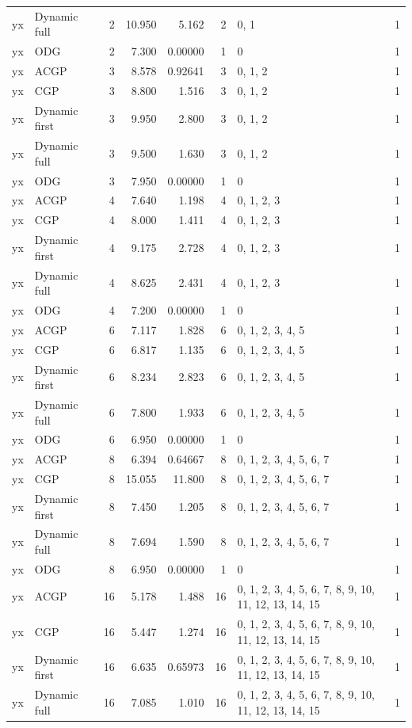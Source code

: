 \documentclass[10pt,a4paper]{article}
\begin{document}
\begin{longtable}{@{}p{23mm}p{29mm}rrrrp{36mm}r@{}}
yx & Dynamic full & 2 & 10.950 & 5.162 & 2 & 0, 1 & 1 \\
yx & ODG & 2 & 7.300 & 0.00000 & 1 & 0 & 1 \\
yx & ACGP & 3 & 8.578 & 0.92641 & 3 & 0, 1, 2 & 1 \\
yx & CGP & 3 & 8.800 & 1.516 & 3 & 0, 1, 2 & 1 \\
yx & Dynamic first & 3 & 9.950 & 2.800 & 3 & 0, 1, 2 & 1 \\
yx & Dynamic full & 3 & 9.500 & 1.630 & 3 & 0, 1, 2 & 1 \\
yx & ODG & 3 & 7.950 & 0.00000 & 1 & 0 & 1 \\
yx & ACGP & 4 & 7.640 & 1.198 & 4 & 0, 1, 2, 3 & 1 \\
yx & CGP & 4 & 8.000 & 1.411 & 4 & 0, 1, 2, 3 & 1 \\
yx & Dynamic first & 4 & 9.175 & 2.728 & 4 & 0, 1, 2, 3 & 1 \\
yx & Dynamic full & 4 & 8.625 & 2.431 & 4 & 0, 1, 2, 3 & 1 \\
yx & ODG & 4 & 7.200 & 0.00000 & 1 & 0 & 1 \\
yx & ACGP & 6 & 7.117 & 1.828 & 6 & 0, 1, 2, 3, 4, 5 & 1 \\
yx & CGP & 6 & 6.817 & 1.135 & 6 & 0, 1, 2, 3, 4, 5 & 1 \\
yx & Dynamic first & 6 & 8.234 & 2.823 & 6 & 0, 1, 2, 3, 4, 5 & 1 \\
yx & Dynamic full & 6 & 7.800 & 1.933 & 6 & 0, 1, 2, 3, 4, 5 & 1 \\
yx & ODG & 6 & 6.950 & 0.00000 & 1 & 0 & 1 \\
yx & ACGP & 8 & 6.394 & 0.64667 & 8 & 0, 1, 2, 3, 4, 5, 6, 7 & 1 \\
yx & CGP & 8 & 15.055 & 11.800 & 8 & 0, 1, 2, 3, 4, 5, 6, 7 & 1 \\
yx & Dynamic first & 8 & 7.450 & 1.205 & 8 & 0, 1, 2, 3, 4, 5, 6, 7 & 1 \\
yx & Dynamic full & 8 & 7.694 & 1.590 & 8 & 0, 1, 2, 3, 4, 5, 6, 7 & 1 \\
yx & ODG & 8 & 6.950 & 0.00000 & 1 & 0 & 1 \\
yx & ACGP & 16 & 5.178 & 1.488 & 16 & 0, 1, 2, 3, 4, 5, 6, 7, 8, 9, 10, 11, 12, 13, 14, 15 & 1 \\
yx & CGP & 16 & 5.447 & 1.274 & 16 & 0, 1, 2, 3, 4, 5, 6, 7, 8, 9, 10, 11, 12, 13, 14, 15 & 1 \\
yx & Dynamic first & 16 & 6.635 & 0.65973 & 16 & 0, 1, 2, 3, 4, 5, 6, 7, 8, 9, 10, 11, 12, 13, 14, 15 & 1 \\
yx & Dynamic full & 16 & 7.085 & 1.010 & 16 & 0, 1, 2, 3, 4, 5, 6, 7, 8, 9, 10, 11, 12, 13, 14, 15 & 1 \\

\end{longtable}
\end{document}
